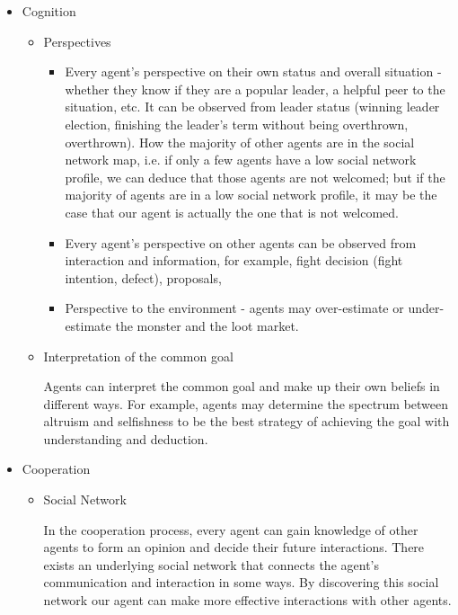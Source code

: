 \begin{itemize}
  \item Cognition
    \begin{itemize}
        \item Perspectives
            \begin{itemize}
            \item Every agent's perspective on their own status and overall situation - whether they know if they are a popular leader, a helpful peer to the situation, etc. It can be observed from leader status (winning leader election, finishing the leader's term without being overthrown, overthrown). How the majority of other agents are in the social network map, i.e. if only a few agents have a low social network profile, we can deduce that those agents are not welcomed; but if the majority of agents are in a low social network profile, it may be the case that our agent is actually the one that is not welcomed.

            \item Every agent's perspective on other agents can be observed from interaction and information, for example, fight decision (fight intention, defect), proposals, 
            \item Perspective to the environment - agents may over-estimate or under-estimate the monster and the loot market.
            \end{itemize}
        \item Interpretation of the common goal
            \begin{flushleft}
            \setlength{\parindent}{2em}
            Agents can interpret the common goal and make up their own beliefs in different ways. For example, agents may determine the spectrum between altruism and selfishness to be the best strategy of achieving the goal with understanding and deduction.
            \end{flushleft}
            \end{itemize}
  \item Cooperation
    \begin{itemize}
        \item Social Network
                \begin{flushleft}
                \setlength{\parindent}{2em}
                In the cooperation process, every agent can gain knowledge of other agents to form an opinion and decide their future interactions. There exists an underlying social network that connects the agent's communication and interaction in some ways. By discovering this social network our agent can make more effective interactions with other agents.
                

\end{flushleft}
\end{itemize}
\end{itemize}
